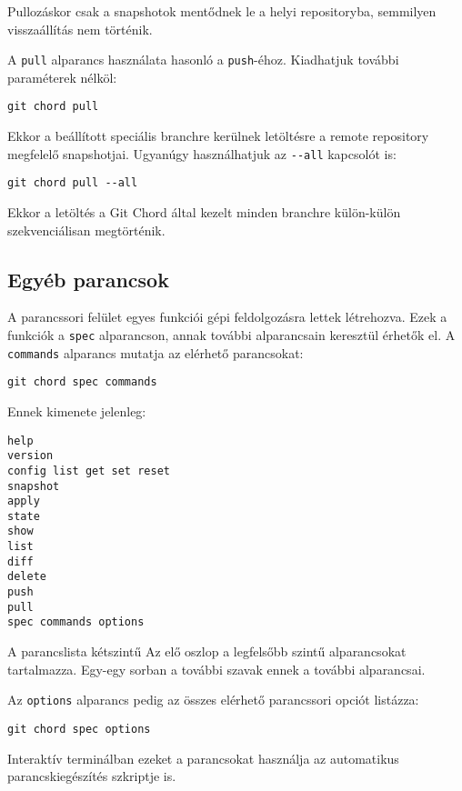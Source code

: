\documentclass[
]{elteikthesis}[2025/03/25]
\begin{document}
Pullozáskor csak a snapshotok mentődnek le a helyi repositoryba,
semmilyen visszaállítás nem történik.

A \verb|pull| alparancs használata hasonló a \verb|push|-éhoz.
Kiadhatjuk további paraméterek nélköl:

\begin{verbatim}
git chord pull
\end{verbatim}

Ekkor a beállított speciális branchre kerülnek letöltésre a remote repository megfelelő snapshotjai.
Ugyanúgy használhatjuk az \verb|--all| kapcsolót is:

\begin{verbatim}
git chord pull --all
\end{verbatim}

Ekkor a letöltés a Git Chord által kezelt minden branchre külön-külön szekvenciálisan megtörténik.

\subsection{Egyéb parancsok}

A parancssori felület egyes funkciói gépi feldolgozásra lettek létrehozva.
Ezek a funkciók a \verb|spec| alparancson, annak további alparancsain keresztül érhetők el.
A \verb|commands| alparancs mutatja az elérhető parancsokat:

\begin{verbatim}
git chord spec commands
\end{verbatim}

Ennek kimenete jelenleg:

\begin{verbatim}
help
version
config list get set reset
snapshot
apply
state
show
list
diff
delete
push
pull
spec commands options
\end{verbatim}

A parancslista kétszintű
Az elő oszlop a legfelsőbb szintű alparancsokat tartalmazza.
Egy-egy sorban a további szavak ennek a további alparancsai.

Az \verb|options| alparancs pedig az összes elérhető parancssori opciót listázza:

\begin{verbatim}
git chord spec options
\end{verbatim}

Interaktív terminálban ezeket a parancsokat használja az automatikus parancskiegészítés szkriptje is.
\end{document}
